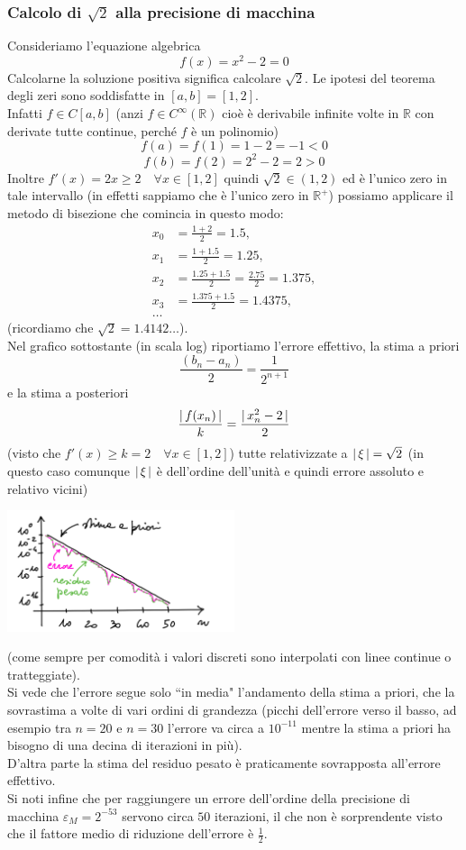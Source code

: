 \subsubsection{Calcolo di $\sqrt{2}$ alla precisione di macchina}
Consideriamo l'equazione algebrica
\[f(x)=x^2-2=0\] Calcolarne la soluzione positiva significa calcolare $\sqrt{2}$. Le ipotesi del teorema degli zeri sono soddisfatte in $[a,b]=[1,2]$.\\
Infatti $f\in C[a,b]$ (anzi $f\in C^{\infty}(\mathbb{R})$ cioè è derivabile infinite volte in $\mathbb{R}$ con derivate tutte continue, perché $f$ è un polinomio) \[f(a)=f(1)=1-2=-1<0\] \[f(b)=f(2)=2^2-2=2>0\]
Inoltre $f'(x)=2x \geq 2\quad\forall x \in [1,2]$ quindi $\sqrt{2}\in (1,2)$ ed è l'unico zero in tale intervallo (in effetti sappiamo che è l'unico zero in $\mathbb{R}^+$)
possiamo applicare il metodo di bisezione che comincia in questo modo: 
\[\begin{split}
    x_0 & = \frac{1+2}{2} = 1.5, \\
    x_1 & = \frac{1+1.5}{2} = 1.25, \\
    x_2 & = \frac{1.25+1.5}{2} = \frac{2.75}{2} = 1.375, \\
    x_3 & = \frac{1.375+1.5}{2} = 1.4375, \\
    \dotso
\end{split}\]
(ricordiamo che $\sqrt{2}=1.4142\dots$).\\
Nel grafico sottostante (in scala log) riportiamo l'errore effettivo, la stima a priori \[\frac{(b_n-a_n)}{2}=\frac{1}{2^{n+1}}\] 
e la stima a posteriori
\[\frac{\lvert\,f(x_n)\,\rvert}{k}=\frac{\lvert\,x_n^2-2\,\rvert}{2}\]
(visto che $f'(x)\ge k=2 \quad \forall x\in [1,2]$) tutte relativizzate a $\lvert\,\xi\,\rvert=\sqrt{2}$ (in questo caso comunque $\lvert\,\xi\,\rvert$ è dell'ordine dell'unità e quindi errore assoluto e relativo vicini)
\begin{center}
    \includegraphics[width=0.5\textwidth]{foto/grafo2}\par
\end{center}
(come sempre per comodità i valori discreti sono interpolati con linee continue o tratteggiate).\\
Si vede che l'errore segue solo ``in media" l'andamento della stima a priori, che la sovrastima a volte di vari ordini di grandezza (picchi dell'errore verso il basso, ad esempio tra $n=20$ e $n=30$ l'errore va circa a $10^{-11}$ mentre la stima a priori ha bisogno di una decina di iterazioni in più).\\
D'altra parte la stima del residuo pesato è praticamente sovrapposta all'errore effettivo.\\
Si noti infine che per raggiungere un errore dell'ordine della precisione di macchina $\varepsilon_M=2^{-53}$ servono circa $50$ iterazioni, il che non è sorprendente visto che il fattore medio di riduzione dell'errore è $\frac{1}{2}$.
\newpage
